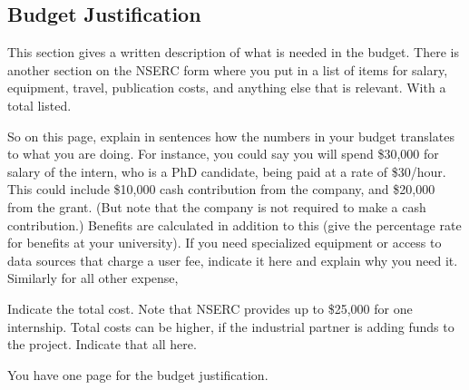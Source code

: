 \documentclass[12pt]{article}
\begin{document}
\setcounter{page}{6}

\subsection*{Budget Justification}

This section gives a written description of what is needed in the budget. There is another section on the NSERC form where you put in a list of items for salary, equipment, travel, publication costs, and anything else that is relevant. With a total listed. 

So on this page, explain in sentences how the numbers in your budget translates to what you are doing. For instance, you could say you will spend \$30,000 for salary of the intern, who is a PhD candidate, being paid at a rate of \$30/hour. This could include \$10,000 cash contribution from the company, and \$20,000 from the grant. (But note that the company is not required to make a cash contribution.) Benefits are calculated in addition to this (give the percentage rate for benefits at your university). If you need specialized equipment or access to data sources that charge a user fee, indicate it here and explain why you need it. Similarly for all other expense,

Indicate the total cost. Note that NSERC provides up to \$25,000 for one internship. Total costs can be higher, if the industrial partner is adding funds to the project. Indicate that all here. 


\vskip 3mm \noindent
You have one page for the budget justification. 



 
\end{document}
